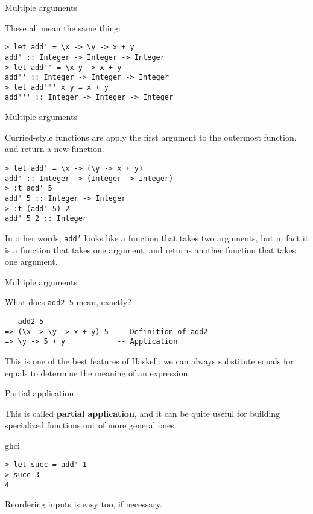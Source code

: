 %
\begin{frame}[fragile]{Multiple arguments}

These all mean the same thing:

\begin{block}{}
\begin{verbatim}
> let add' = \x -> \y -> x + y
add' :: Integer -> Integer -> Integer
> let add'' = \x y -> x + y
add'' :: Integer -> Integer -> Integer
> let add''' x y = x + y
add''' :: Integer -> Integer -> Integer
\end{verbatim}
\end{block}

\end{frame}

%
\begin{frame}[fragile]{Multiple arguments}

Curried-style functions are apply the first argument to the outermost function,
and return a new function.

\begin{block}{}
\begin{verbatim}
> let add' = \x -> (\y -> x + y)
add' :: Integer -> (Integer -> Integer)
> :t add' 5
add' 5 :: Integer -> Integer
> :t (add' 5) 2
add' 5 2 :: Integer
\end{verbatim}
\end{block}

In other words, \texttt{add'} looks like a function that takes two arguments,
but in fact it is a function that takes one argument, and returns another
function that takes one argument.

\end{frame}

%
\begin{frame}[fragile]{Multiple arguments}

What does \texttt{add2 5} mean, exactly?

\begin{block}{}
\begin{verbatim}
   add2 5
=> (\x -> \y -> x + y) 5  -- Definition of add2
=> \y -> 5 + y            -- Application
\end{verbatim}
\end{block}

This is one of the best features of Haskell: we can always substitute equals for
equals to determine the meaning of an expression.

\end{frame}


%
\begin{frame}[fragile]{Partial application}

This is called \textbf{partial application}, and it can be quite useful for
building specialized functions out of more general ones.

\begin{block}{ghci}
\begin{verbatim}
> let succ = add' 1
> succ 3
4
\end{verbatim}
\end{block}

Reordering inputs is easy too, if necessary.

\end{frame}

